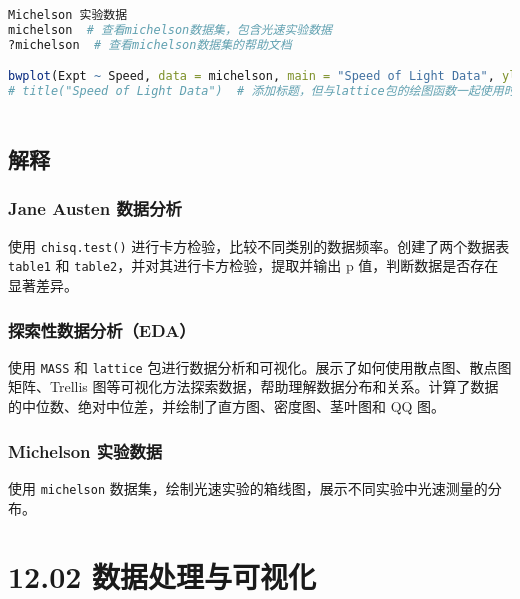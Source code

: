 \documentclass[UTF8]{report}
\theoremstyle{MyLineTheoremStyle} %
\theoremstyle{MyBlockTheoremStyle} %
\theoremstyle{MySubsubsectionStyle} %
\begin{document}
\begin{lstlisting}[language=R]
Michelson 实验数据
michelson  # 查看michelson数据集，包含光速实验数据
?michelson  # 查看michelson数据集的帮助文档

bwplot(Expt ~ Speed, data = michelson, main = "Speed of Light Data", ylab = "Experiment No.")  # 绘制箱线图，展示不同实验光速的分布
# title("Speed of Light Data")  # 添加标题，但与lattice包的绘图函数一起使用时可能会出现问题



\end{lstlisting}

    
\section*{解释}

\subsection*{Jane Austen 数据分析}

使用 \texttt{chisq.test()} 进行卡方检验，比较不同类别的数据频率。创建了两个数据表 \texttt{table1} 和 \texttt{table2}，并对其进行卡方检验，提取并输出 p 值，判断数据是否存在显著差异。

\subsection*{探索性数据分析（EDA）}

使用 \texttt{MASS} 和 \texttt{lattice} 包进行数据分析和可视化。展示了如何使用散点图、散点图矩阵、Trellis 图等可视化方法探索数据，帮助理解数据分布和关系。计算了数据的中位数、绝对中位差，并绘制了直方图、密度图、茎叶图和 QQ 图。

\subsection*{Michelson 实验数据}

使用 \texttt{michelson} 数据集，绘制光速实验的箱线图，展示不同实验中光速测量的分布。



\chapter{12.02 数据处理与可视化}
\end{document}
